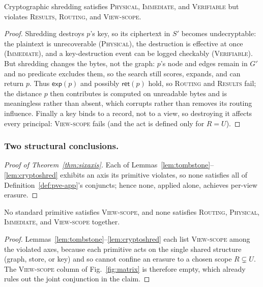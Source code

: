 \documentclass[sigconf, nonacm, review]{acmart}
\begin{document}
\begin{lemma}
\label{lem:cryptoshred}
Cryptographic shredding satisfies \textsc{Physical}, \textsc{Immediate}, and
\textsc{Verifiable} but violates \textsc{Results}, \textsc{Routing}, and
\textsc{View-scope}.
\end{lemma}
\begin{proof}
Shredding destroys $p$'s key, so its ciphertext in $S'$ becomes
undecryptable: the plaintext is unrecoverable (\textsc{Physical}), the
destruction is effective at once (\textsc{Immediate}), and a key-destruction
event can be logged checkably (\textsc{Verifiable}). But shredding changes the
bytes, not the graph: $p$'s node and edges remain in $G'$ and no predicate
excludes them, so the search still scores, expands, and can return $p$. Thus
$\mathsf{exp}(p)$ and possibly $\mathsf{ret}(p)$ hold, so \textsc{Routing} and
\textsc{Results} fail; the distance $p$ then contributes is computed on
unreadable bytes and is meaningless rather than absent, which corrupts rather
than removes its routing influence. Finally a key binds to a record, not to a
view, so destroying it affects every principal: \textsc{View-scope} fails (and
the act is defined only for $R=U$).
\end{proof}

\subsubsection{Two structural conclusions.}
\label{app:imposs-cor}

\begin{proof}[Proof of Theorem~\ref{thm:sixaxis}]
Each of Lemmas~\ref{lem:tombstone}--\ref{lem:cryptoshred} exhibits an axis its
primitive violates, so none satisfies all of
Definition~\ref{def:pve-app}'s conjuncts; hence none, applied alone, achieves
per-view erasure.
\end{proof}

\begin{corollary}
\label{cor:viewscope-empty}
No standard primitive satisfies \textsc{View-scope}, and none satisfies
\textsc{Routing}, \textsc{Physical}, \textsc{Immediate}, and \textsc{View-scope}
together.
\end{corollary}
\begin{proof}
Lemmas~\ref{lem:tombstone}--\ref{lem:cryptoshred} each list \textsc{View-scope}
among the violated axes, because each primitive acts on the single shared
structure (graph, store, or key) and so cannot confine an erasure to a chosen
scope $R\subsetneq U$. The \textsc{View-scope} column of Fig.~\ref{fig:matrix}
is therefore empty, which already rules out the joint conjunction in the
claim.
\end{proof}
\end{document}
